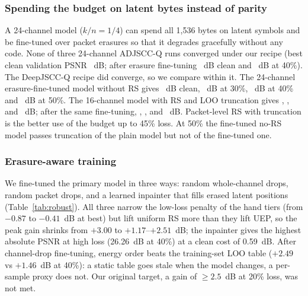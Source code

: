 \documentclass[journal]{IEEEtran}
\begin{document}
\subsubsection{Spending the budget on latent bytes instead of parity}
A 24-channel model ($k/n=1/4$) can spend all 1,536 bytes on latent symbols and be fine-tuned over packet
erasures so that it degrades gracefully without any code. None of three 24-channel ADJSCC-Q runs
converged under our recipe (best clean validation PSNR \NoRsBestValClean~dB; after erasure fine-tuning
\NoRsJsccClean~dB clean and \NoRsJsccForty~dB at 40\%). The DeepJSCC-Q recipe did converge, so we compare
within it. The 24-channel erasure-fine-tuned model without RS gives \NoRsDeepClean~dB clean,
\NoRsDeepThirty~dB at 30\%, \NoRsDeepForty~dB at 40\% and \NoRsDeepFifty~dB at 50\%. The 16-channel model
with RS and LOO truncation gives \RsDeepClean, \RsDeepTruncThirty, \RsDeepTruncForty{} and
\RsDeepTruncFifty~dB; after the same fine-tuning, \RsDeepRobustClean, \RsDeepRobustTruncThirty,
\RsDeepRobustTruncForty{} and \RsDeepRobustTruncFifty~dB. Packet-level RS with truncation is the better use of
the budget up to 45\% loss. At 50\% the fine-tuned no-RS model passes truncation of the plain model but
not of the fine-tuned one.

\subsubsection{Erasure-aware training}
We fine-tuned the primary model in three ways: random whole-channel drops, random packet drops, and a
learned inpainter that fills erased latent positions (Table~\ref{tab:robust}). All three narrow the
low-loss penalty of the hand tiers (from $-0.87$ to $-0.41$~dB at best) but lift uniform RS more than they
lift UEP, so the peak gain shrinks from $+3.00$ to $+1.17$--$+2.51$~dB; the inpainter gives the highest
absolute PSNR at high loss (26.26~dB at 40\%) at a clean cost of 0.59~dB. After channel-drop
fine-tuning, energy order beats the training-set LOO table ($+2.49$ vs $+1.46$~dB at 40\%): a static table
goes stale when the model changes, a per-sample proxy does not. Our original target, a gain of
$\ge2.5$~dB at 20\% loss, was not met.

\begin{table}[t]\centering\caption{Erasure-aware fine-tuning of the primary image model}\label{tab:robust}
\end{table}
\end{document}
